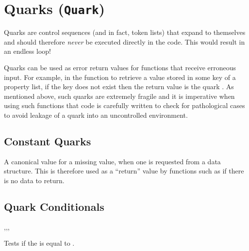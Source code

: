 \documentclass[oneside]{book}
\begin{document}
\chapter{Quarks (\texttt{Quark})}


Quarks are control sequences (and in fact, token lists) that expand
to themselves and should therefore \emph{never} be executed directly
in the code. This would result in an endless loop!

Quarks can be used as error return values for functions that receive erroneous input.
For example, in the function  to retrieve a value stored
in some key of a property list, if the key does not exist then the return value
is the quark .
As mentioned above, such quarks are extremely fragile and it is imperative
when using such functions that code is carefully written to check for
pathological cases to avoid leakage of a quark into an uncontrolled
environment.

\section{Constant Quarks}

\begin{variable}{\qNoValue}
A canonical value for a missing value, when one is requested from
a data structure. This is therefore used as a \enquote{return} value
by functions such as  if there is no data to return.
\end{variable}

\section{Quark Conditionals}

\begin{function}{\QuarkVarIfNoValue,\QuarkVarIfNoValueT,\QuarkVarIfNoValueF,\QuarkVarIfNoValueTF}
\begin{syntax}
 
  
  
   
\end{syntax}
Tests if the  is equal to .
\begin{demohigh}
\ClistGet \cEmptyClist \lTmpaTl
\QuarkVarIfNoValueTF {} {}
\end{demohigh}
\begin{demohigh}
\SeqPop \cEmptySeq \lTmpaTl
\QuarkVarIfNoValueTF {} {}
\end{demohigh}
\begin{demohigh}
\PropSetFromKeyval {}
\PropGet {} \lTmpaTl
\QuarkVarIfNoValueTF {} {}
\end{demohigh}
\end{function}
\end{document}
